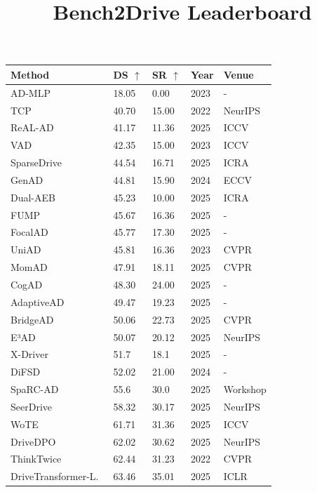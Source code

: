 \documentclass[10pt,twocolumn,letterpaper]{article}
\title{Bench2Drive Leaderboard}
\begin{document}
\begin{table}[t]
\setlength{\tabcolsep}{4pt}
\small
\centering
\begin{tabular}{l|ll|ll}
\toprule
\textbf{Method} & \textbf{DS} $\uparrow$ & \textbf{SR} $\uparrow$ & \textbf{Year} & \textbf{Venue} \\
\midrule
AD-MLP~\cite{Zhai2023ARXIV} & 18.05 & 0.00 & 2023 & - \\
TCP~\cite{Wu2022NeurIPS} & 40.70 & 15.00 & 2022 & NeurIPS \\
ReAL-AD~\cite{Lu2025ICCV} & 41.17 & 11.36 & 2025 & ICCV \\
VAD~\cite{Jiang2023ICCV} & 42.35 & 15.00 & 2023 & ICCV \\
SparseDrive~\cite{Sun2025ICRA} & 44.54 & 16.71 & 2025 & ICRA \\
GenAD~\cite{Zheng2024ECCV} & 44.81 & 15.90 & 2024 & ECCV \\
Dual-AEB~\cite{Zhang2025ICRA} & 45.23 & 10.00 & 2025 & ICRA \\
FUMP~\cite{Liu2025ARXIVc} & 45.67 & 16.36 & 2025 & - \\
FocalAD~\cite{Sun2025ARXIV} & 45.77 & 17.30 & 2025 & - \\
UniAD~\cite{Hu2023CVPR} & 45.81 & 16.36 & 2023 & CVPR \\
MomAD~\cite{Song2025CVPR} & 47.91 & 18.11 & 2025 & CVPR \\
CogAD~\cite{Wang2025ARXIV} & 48.30 & 24.00 & 2025 & - \\
AdaptiveAD~\cite{Tang2025ARXIV} & 49.47 & 19.23 & 2025 & - \\
BridgeAD~\cite{Zhang2025CVPR} & 50.06 & 22.73 & 2025 & CVPR \\
E³AD~\cite{Niu2025NEURIPS} & 50.07 & 20.12 & 2025 & NeurIPS \\
X-Driver~\cite{Liu2025ARXIVb} & 51.7 & 18.1 & 2025 & - \\
DiFSD~\cite{Su2024ARXIV} & 52.02 & 21.00 & 2024 & - \\
SpaRC-AD~\cite{Wolters2025ICCVWORK} & 55.6 & 30.0 & 2025 & Workshop \\
SeerDrive~\cite{Zhang2025NEURIPS} & 58.32 & 30.17 & 2025 & NeurIPS \\
WoTE~\cite{Li2025ICCV} & 61.71 & 31.36 & 2025 & ICCV \\
DriveDPO~\cite{Shang2025NEURIPS} & 62.02 & 30.62 & 2025 & NeurIPS \\
ThinkTwice~\cite{Jia2023CVPR} & 62.44 & 31.23 & 2022 & CVPR \\
DriveTransformer-L.~\cite{Jia2025ICLR} & 63.46 & 35.01 & 2025 & ICLR \\

\end{tabular}
\end{table}
\end{document}
